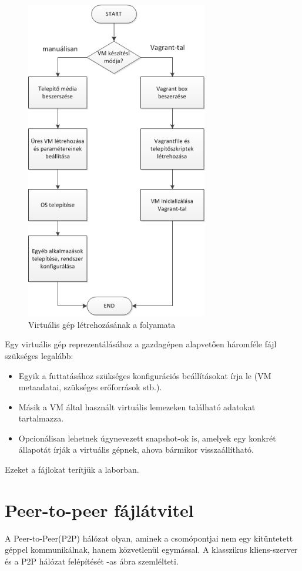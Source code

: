 \begin{figure}[ht]
	\centering
	\includegraphics[height=140mm, keepaspectratio]{figures/vmcreate.png}
	\caption{Virtuális gép létrehozásának a folyamata}
	\label{fig:vmcreate}
\end{figure}

Egy virtuális gép reprezentálásához a gazdagépen alapvetően háromféle fájl szükséges legalább:

\begin{itemize}
	\item Egyik a futtatásához szükséges konfigurációs beállításokat írja le (VM metaadatai, szükséges erőforrások stb.).
	\item Másik a VM által használt virtuális lemezeken található adatokat tartalmazza.
	\item Opcionálisan lehetnek úgynevezett snapshot-ok is, amelyek egy konkrét állapotát írják a virtuális gépnek, ahova bármikor visszaállítható.
\end{itemize}

Ezeket a fájlokat terítjük a laborban.
\section{Peer-to-peer fájlátvitel} 
\label{sect:p2p}
A Peer-to-Peer(P2P) hálózat olyan, aminek a csomópontjai nem egy kitüntetett géppel 
kommunikálnak, hanem közvetlenül egymással. A klasszikus kliens-szerver és a P2P hálózat felépítését
-as ábra szemlélteti.

